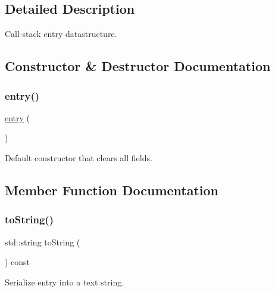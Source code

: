 \subsection{Detailed Description}
Call-\/stack entry datastructure. 



\subsection{Constructor \& Destructor Documentation}
\mbox{\label{structstacktrace_1_1entry_a59990719363a79bbd250a392185b8e75}} 
\subsubsection{\texorpdfstring{entry()}{entry()}}
{\footnotesize\ttfamily \mbox{\hyperlink{structstacktrace_1_1entry}{entry}} (\begin{DoxyParamCaption}{ }\end{DoxyParamCaption})\hspace{0.3cm}{\ttfamily [inline]}}



Default constructor that clears all fields. 



\subsection{Member Function Documentation}
\mbox{\label{structstacktrace_1_1entry_a1fe5121d6528fdea3f243321b3fa3a49}} 
\subsubsection{\texorpdfstring{to\+String()}{toString()}}
{\footnotesize\ttfamily std\+::string to\+String (\begin{DoxyParamCaption}{ }\end{DoxyParamCaption}) const\hspace{0.3cm}{\ttfamily [inline]}}



Serialize entry into a text string. 



